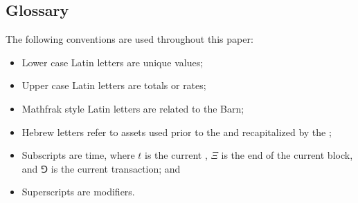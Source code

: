 \documentclass[class=article, crop=false]{standalone}
\begin{document}
\subsection{Glossary}
The following conventions are used throughout this paper:
\begin{itemize}
    \item Lower case Latin letters are unique values;
    \item Upper case Latin letters are totals or rates;
    \item Mathfrak style Latin letters are related to the Barn; 
    \item Hebrew letters refer to assets used prior to the  and recapitalized by the ;
    \item Subscripts are time, where $t$ is the current , $\Xi$ is the end of the current block, and $\Game$ is the current transaction; and
    \item Superscripts are modifiers.
\end{itemize}
\end{document}
